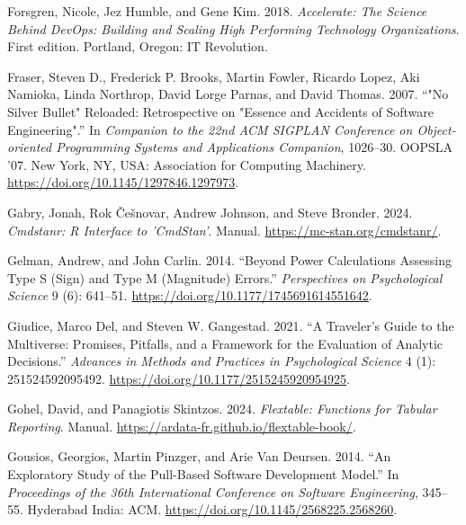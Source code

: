 \documentclass[
]{article}
\newlength{\cslhangindent}
\newenvironment{CSLReferences}[2] %
 {\begin{list}{}{%
  \setlength{\itemindent}{0pt}
  \setlength{\leftmargin}{0pt}
  \setlength{\parsep}{0pt}
  \ifodd #1
   \setlength{\leftmargin}{\cslhangindent}
   \setlength{\itemindent}{-1\cslhangindent}
  \fi
  \setlength{\itemsep}{#2\baselineskip}}}
 {\end{list}}
\begin{document}
\begin{CSLReferences}{1}{0}
Forsgren, Nicole, Jez Humble, and Gene Kim. 2018. \emph{Accelerate: The
Science Behind {DevOps}: Building and Scaling High Performing Technology
Organizations}. First edition. Portland, Oregon: IT Revolution.

Fraser, Steven D., Frederick P. Brooks, Martin Fowler, Ricardo Lopez,
Aki Namioka, Linda Northrop, David Lorge Parnas, and David Thomas. 2007.
{``"{No} Silver Bullet" Reloaded: Retrospective on "Essence and
Accidents of Software Engineering".''} In \emph{Companion to the 22nd
{ACM SIGPLAN} Conference on {Object-oriented} Programming Systems and
Applications Companion}, 1026--30. {OOPSLA} '07. New York, NY, USA:
Association for Computing Machinery.
\url{https://doi.org/10.1145/1297846.1297973}.

Gabry, Jonah, Rok Češnovar, Andrew Johnson, and Steve Bronder. 2024.
\emph{Cmdstanr: {R Interface} to '{CmdStan}'}. Manual.
\url{https://mc-stan.org/cmdstanr/}.

Gelman, Andrew, and John Carlin. 2014. {``Beyond {Power Calculations
Assessing Type S} ({Sign}) and {Type M} ({Magnitude}) {Errors}.''}
\emph{Perspectives on Psychological Science} 9 (6): 641--51.
\url{https://doi.org/10.1177/1745691614551642}.

Giudice, Marco Del, and Steven W. Gangestad. 2021. {``A {Traveler}'s
{Guide} to the {Multiverse}: {Promises}, {Pitfalls}, and a {Framework}
for the {Evaluation} of {Analytic Decisions}.''} \emph{Advances in
Methods and Practices in Psychological Science} 4 (1): 251524592095492.
\url{https://doi.org/10.1177/2515245920954925}.

Gohel, David, and Panagiotis Skintzos. 2024. \emph{Flextable:
{Functions} for Tabular Reporting}. Manual.
\url{https://ardata-fr.github.io/flextable-book/}.

Gousios, Georgios, Martin Pinzger, and Arie Van Deursen. 2014. {``An
Exploratory Study of the Pull-Based Software Development Model.''} In
\emph{Proceedings of the 36th {International Conference} on {Software
Engineering}}, 345--55. Hyderabad India: ACM.
\url{https://doi.org/10.1145/2568225.2568260}.


\end{CSLReferences}
\end{document}
